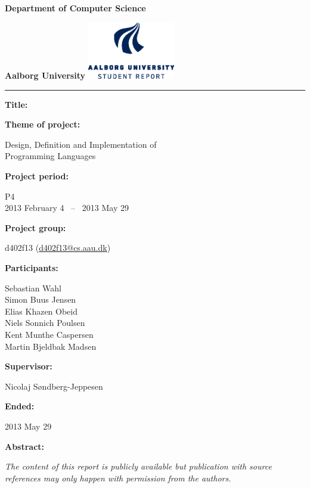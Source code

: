 \begin{nopagebreak}
  \begin{minipage}{\textwidth}
    \vspace{2cm}
\LARGE{\textbf{Department of Computer Science}}\vspace{-2.1cm}

\large{\textbf{Aalborg University}}
\hspace{8.30cm}\includegraphics[height=2.5cm]{pictures/aau_logo_en_blue.eps}
\end{minipage}
\vspace{0.1cm}
\hrule

\newcommand{\titleitem}[2]{\textbf{#1:}

\hspace*{0.5cm}
\begin{minipage}{0.9\columnwidth}#2\end{minipage}
\vspace{0.25cm}}
\begin{multicols}{2}

\titleitem{Title}{}

\titleitem{Theme of project}{Design, Definition and Implementation of \\Programming Languages}

\titleitem{Project period}{P4\\2013 February 4 ~--~ 2013 May 29}

\titleitem{Project group}{d402f13 (\url{d402f13@cs.aau.dk})}

\titleitem{Participants}{
    Sebastian Wahl\\
    Simon Buus Jensen\\
    Elias Khazen Obeid\\
    Niels Sonnich Poulsen\\
    Kent Munthe Caspersen\\
    Martin Bjeldbak Madsen
}

\titleitem{Supervisor}{Nicolaj Søndberg-Jeppesen}

\titleitem{Ended}{2013 May 29}

\vfill
\columnbreak

\titleitem{Abstract}{}

\end{multicols}
\vfill
\centering
\textit{The content of this report is publicly available but publication with source references may only happen with permission from the authors.}
\end{nopagebreak}
